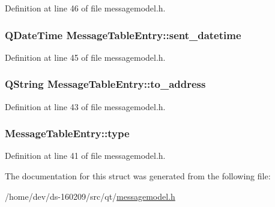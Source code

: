 Definition at line 46 of file messagemodel.\+h.

\hypertarget{struct_message_table_entry_ac780cbf7059b3a578a728eeb556f262d}{}
\subsubsection[{sent\+\_\+datetime}]{\setlength{\rightskip}{0pt plus 5cm}Q\+Date\+Time Message\+Table\+Entry\+::sent\+\_\+datetime}\label{struct_message_table_entry_ac780cbf7059b3a578a728eeb556f262d}


Definition at line 45 of file messagemodel.\+h.

\hypertarget{struct_message_table_entry_a1c0fe7cf6e729031f5624264e9c4d907}{}
\subsubsection[{to\+\_\+address}]{\setlength{\rightskip}{0pt plus 5cm}Q\+String Message\+Table\+Entry\+::to\+\_\+address}\label{struct_message_table_entry_a1c0fe7cf6e729031f5624264e9c4d907}


Definition at line 43 of file messagemodel.\+h.

\hypertarget{struct_message_table_entry_a7106560f01940e8ca3c205993984c352}{}
\subsubsection[{type}]{ Message\+Table\+Entry\+::type}\label{struct_message_table_entry_a7106560f01940e8ca3c205993984c352}


Definition at line 41 of file messagemodel.\+h.



The documentation for this struct was generated from the following file\+:\begin{DoxyCompactItemize}
\item 
/home/dev/ds-\/160209/src/qt/\hyperlink{messagemodel_8h}{messagemodel.\+h}\end{DoxyCompactItemize}
